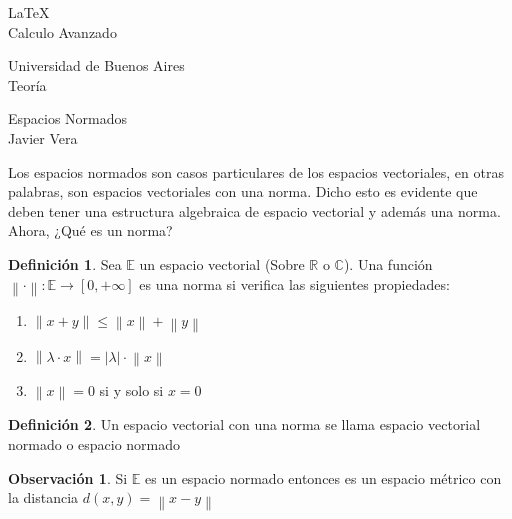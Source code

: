 \documentclass[12pt]{article}
\newcommand{\R}{\mathbb{R}}
\newcommand{\E}{\mathbb{E}}
\newcommand{\ra}{\rightarrow}
\newcommand{\norm}[1]{\left\lVert#1\right\rVert}
\theoremstyle{definition}
\newtheorem{definition}{Definición}[section]
\newtheorem*{remark}{Observación}
\begin{document}
\LaTeX \\

Calculo Avanzado

Universidad de Buenos Aires\\

Teoría 

Espacios Normados\\

Javier Vera


\newpage

Los espacios normados son casos particulares de los espacios vectoriales, en otras palabras, son espacios vectoriales con una norma. Dicho esto es evidente que deben tener una estructura algebraica de espacio vectorial y además una norma.
Ahora, ¿Qué es un norma?

\begin{definition}
	Sea $\E$ un espacio vectorial (Sobre $\R$ o $\mathbb{C}$). Una función $\norm{\cdot}:\E \ra [0,+\infty]$ es una norma si verifica las siguientes propiedades:
	 \begin{enumerate}[(1)]
		\item $\norm{x+y} \leq \norm{x} + \norm{y}$
		
		\item $\norm{\lambda \cdot x} = |\lambda| \cdot \norm{x}$

		\item $\norm{x} = 0$ si y solo si $x=0$

	\end{enumerate}
\end{definition}
\begin{definition}
  Un espacio vectorial con una norma se llama espacio vectorial normado o espacio normado
\end{definition}
\begin{remark}
	Si $\E$ es un espacio normado entonces es un espacio métrico con la distancia $d(x,y) = \norm {x-y}$
\end{remark}
\end{document}

